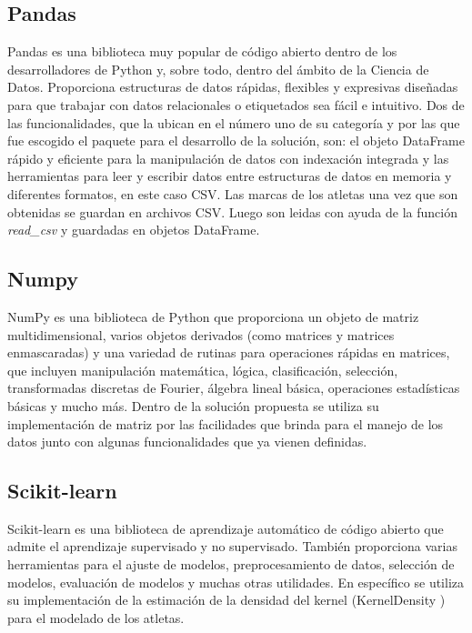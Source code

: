 \subsection{Pandas}

Pandas \cite{pandas} es una biblioteca muy popular de código abierto dentro de los desarrolladores de Python y, sobre todo, dentro del ámbito de la Ciencia de Datos. Proporciona estructuras de datos rápidas, flexibles y expresivas diseñadas para que trabajar con datos relacionales o etiquetados sea fácil e intuitivo. Dos de las funcionalidades, que la ubican en el número uno de su categoría y por las que fue escogido el paquete para el desarrollo de la solución, son: el objeto DataFrame rápido y eficiente para la manipulación de datos con indexación integrada y las herramientas para leer y escribir datos entre estructuras de datos en memoria y diferentes formatos, en este caso CSV. 
Las marcas de los atletas una vez que son obtenidas se guardan en archivos CSV. Luego son leidas con ayuda de la función \textit{read\_csv} y guardadas en objetos DataFrame.

\subsection{Numpy}

NumPy \cite{numpy} es una biblioteca de Python que proporciona un objeto de matriz multidimensional, varios objetos derivados (como matrices y matrices enmascaradas) y una variedad de rutinas para operaciones rápidas en matrices, que incluyen manipulación matemática, lógica, clasificación, selección, transformadas discretas de Fourier, álgebra lineal básica, operaciones estadísticas básicas y mucho más. Dentro de la solución propuesta se utiliza su implementación de matriz por las facilidades que brinda para el manejo de los datos junto con algunas funcionalidades que ya vienen definidas.   

\subsection{Scikit-learn} 

Scikit-learn \cite{sklearn} es una biblioteca de aprendizaje automático de código abierto que admite el aprendizaje supervisado y no supervisado. También proporciona varias herramientas para el ajuste de modelos, preprocesamiento de datos, selección de modelos, evaluación de modelos y muchas otras utilidades. En específico se utiliza su implementación de la estimación de la densidad del kernel (KernelDensity \cite{kerneldensity}) para el modelado de los atletas.

